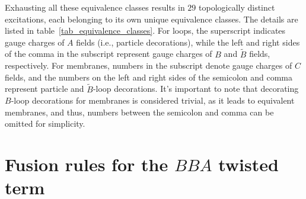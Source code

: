 \documentclass[11pt,nofootinbib,preprint]{revtex4-1}
\begin{document}
Exhausting all these equivalence classes results in $29$ topologically distinct excitations, each belonging to its own unique equivalence classes. The details are listed in table~\ref{tab_equivalence_classes}. For loops, the superscript indicates gauge charges of $A$ fields (i.e., particle decorations), while the left and right sides of the comma in the subscript represent gauge charges of $B$ and $\tilde{B}$ fields, respectively. For membranes, numbers in the subscript denote gauge charges of $C$ fields, and the numbers on the left and right sides of the semicolon and comma represent particle and $\tilde{B}$-loop decorations. It's important to note that decorating ${B}$-loop decorations for membranes is considered trivial, as it leads to equivalent membranes, and thus, numbers between the semicolon and comma can be omitted for simplicity.


\section{Fusion rules for the $BBA$ twisted term\label{s3}}
\end{document}
